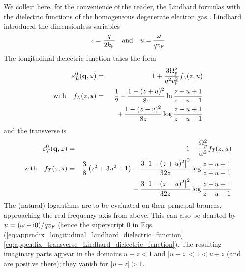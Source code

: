 \documentclass[11pt, oneside]{article}   	%
\def\OmegaP{\Omega_{p}}
\begin{document}
We collect here, for the convenience of the reader, the Lindhard formulas with the dielectric
functions of the homogeneous degenerate electron gas \citep{Lindhard_1954}. 
Lindhard introduced the dimensionless variables
\begin{align}
z = \frac{q}{2k_{\rm F}} \quad \text{and} \quad u = \frac{\omega}{qv_{\rm F}}
\end{align}
The longitudinal dielectric function takes the form
\begin{eqnarray}
\varepsilon^0_{L}({\bf q}, \omega) &=& 
1 + \frac{3 \OmegaP^2}{q^2v^2_{\rm F}} f_{L}(z,u) 
\label{eq:appendix_longitudinal_Lindhard_dielectric_function}
\\
\text{with} \quad f_{L}(z,u) &=& 
\frac{1}{2} + \frac{1-(z+u)^2}{8z}\ln \frac{z+u+1}{z+u-1} 
\nonumber\\
&&\phantom{\frac{1}{2}} {} + \frac{1-(z-u)^2}{8z} \log \frac{z-u+1}{z-u-1}
\label{eq:appendix_longitudinal_Lindhard_f_function}
\end{eqnarray}
and the transverse is
\begin{eqnarray}
\varepsilon^0_{T}({\bf q}, \omega) & = & 1 - \frac{\OmegaP^2}{\omega^2}f_{T}(z,u) 
\label{eq:appendix_transverse_Lindhard_dielectric_function} 
\\
\text{with} \quad f_{T}(z,u) & = & 
\frac{3}{8}\left(z^2+3u^2+1\right) 
- \frac{3 \left[1 - (z + u)^2\right]^2}{32z} 
\log\frac{z+u+1}{z+u-1} 
\nonumber 
\\
&& \phantom{\frac{3}{8}\left(z^2+3u^2+1\right) }
{} - \frac{3 \left[1 - (z - u)^2\right]^2}{32z} 
\log\frac{z-u+1}{z-u-1} 
\label{eq:appendix_transverse_Lindhard_f_function}
\end{eqnarray}
The (natural) logarithms are to be evaluated on their principal branchs, approaching
the real frequency axis from above. This can also be denoted by 
$u = (\omega + {\rm i}0)/q v_{\rm F}$ (hence the superscript $0$ in Eqs.\,(\ref{eq:appendix_longitudinal_Lindhard_dielectric_function}, \ref{eq:appendix_transverse_Lindhard_dielectric_function}). The resulting imaginary parts appear in the domains
$u + z < 1$ and $|u - z| < 1 < u + z$ (and are positive there); they vanish for $|u - z| > 1$.
\end{document}
